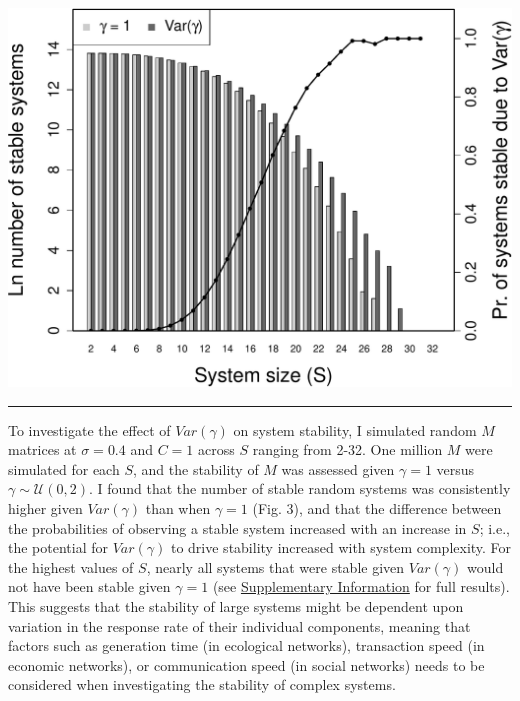 \documentclass[]{article}
\begin{document}
\includegraphics{unnamed-chunk-9-1.pdf}

\begin{center}\rule{0.5\linewidth}{\linethickness}\end{center}

To investigate the effect of \(Var(\gamma)\) on system stability, I
simulated random \(M\) matrices at \(\sigma = 0.4\) and \(C = 1\) across
\(S\) ranging from 2-32. One million \(M\) were simulated 
for each \(S\), and the stability of \(M\) was assessed given \(\gamma = 1\)
versus \(\gamma \sim \mathcal{U}(0, 2)\). I found that the number of stable 
random systems was
consistently higher given \(Var(\gamma)\) than when \(\gamma = 1\) (Fig.
3), and that the difference between the probabilities of observing a
stable system increased with an increase in \(S\); i.e., the potential
for \(Var(\gamma)\) to drive stability increased with system complexity.
For the highest values of \(S\), nearly all systems that were stable
given \(Var(\gamma)\) would not have been stable given \(\gamma = 1\) (see
\hyperlink{SIstart}{Supplementary Information} for full results). This 
suggests that the
stability of large systems might be dependent upon variation in the
response rate of their individual components, meaning that factors such
as generation time (in ecological networks), transaction speed (in
economic networks), or communication speed (in social networks) needs to
be considered when investigating the stability of complex systems.
\end{document}
